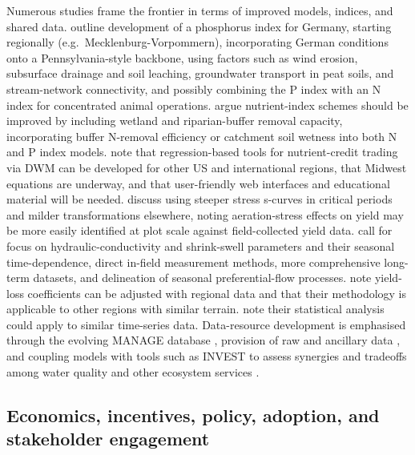 Numerous studies frame the frontier in terms of improved models, indices, and shared data. \textcite{Buczko2007} outline development of a phosphorus index for Germany, starting regionally (e.g.\ Mecklenburg-Vorpommern), incorporating German conditions onto a Pennsylvania-style backbone, using factors such as wind erosion, subsurface drainage and soil leaching, groundwater transport in peat soils, and stream-network connectivity, and possibly combining the P index with an N index for concentrated animal operations. \textcite{Pärn2012} argue nutrient-index schemes should be improved by including wetland and riparian-buffer removal capacity, incorporating buffer N-removal efficiency or catchment soil wetness into both N and P index models. \textcite{Negm2016} note that regression-based tools for nutrient-credit trading via DWM can be developed for other US and international regions, that Midwest equations are underway, and that user-friendly web interfaces and educational material will be needed. \textcite{Wang2016} discuss using steeper stress s-curves in critical periods and milder transformations elsewhere, noting aeration-stress effects on yield may be more easily identified at plot scale against field-collected yield data. \textcite{Boivin2006} call for focus on hydraulic-conductivity and shrink-swell parameters and their seasonal time-dependence, direct in-field measurement methods, more comprehensive long-term datasets, and delineation of seasonal preferential-flow processes. \textcite{ROBINSON1992} note yield-loss coefficients can be adjusted with regional data and that their methodology is applicable to other regions with similar terrain. \textcite{Adeuya2012} note their statistical analysis could apply to similar time-series data. Data-resource development is emphasised through the evolving MANAGE database \parencite{Hertzberger2019}, provision of raw and ancillary data \parencite{Chatterjee2020b}, and coupling models with tools such as INVEST to assess synergies and tradeoffs among water quality and other ecosystem services \parencite{McLellan2015}.

\subsection{Economics, incentives, policy, adoption, and stakeholder engagement}

